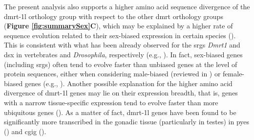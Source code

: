 \documentclass[../main.tex]{subfiles}
\begin{document}
The present analysis also supports a higher amino acid sequence divergence of the \gls{dmrt-1l} orthology group with respect to the other \gls{dmrt} orthology groups (\textbf{Figure \ref{fig:summarySex}C}), which may be explained by a higher rate of sequence evolution related to their sex-biased expression in certain species (\textbf{\cite{zhang2014genomic,shi2015novo,li2018foxl2,evensen2022comparative}}). This is consistent with what has been already observed for the \glspl{srg} \textit{Dmrt1} and \gls{dsx} in vertebrates and \textit{Drosophila}, respectively (e.g., \textbf{\cite{bewick2011evolution,baral2019genetic}}). In fact, sex-biased genes (including \glspl{srg}) often tend to evolve faster than unbiased genes at the level of protein sequences, either when considering male-biased (reviewed in \textbf{\cite{parsch2013evolutionary,grath2016sex}}) or female-biased genes (e.g., \textbf{\cite{papa2017rapid,ghiselli2018comparative}}). Another possible explanation for the higher amino acid divergence of \gls{dmrt-1l} genes may lie on their expression breadth, that is, genes with a narrow tissue-specific expression tend to evolve faster than more ubiquitous genes (\textbf{\cite{parsch2013evolutionary,xu2022multi}}). As a matter of fact, \gls{dmrt-1l} genes have been found to be significantly more transcribed in the gonadic tissue (particularly in testes) in \gls{pyes} (\textbf{\cite{li2018foxl2}}) and \gls{cgig} (\textbf{\cite{yue2021variance}}).
\end{document}
